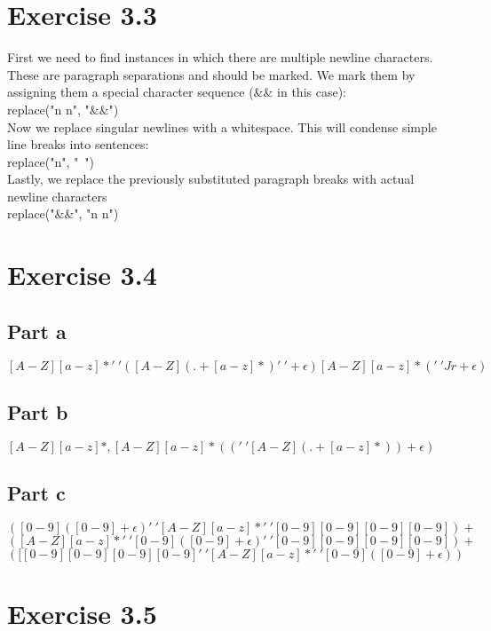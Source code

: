 \documentclass{article}%
\begin{document}
\section{Exercise 3.3}
First we need to find instances in which there are multiple newline characters. These are paragraph separations and should be
marked. We mark them by assigning them a special character sequence (\&\& in this case): \\

replace("\setminus n \setminus n", "\&\&") \\

\noindent Now we replace singular newlines with a whitespace. This will condense simple line breaks into sentences: \\

replace("\setminus n", "{\ }") \\

\noindent Lastly, we replace the previously substituted paragraph breaks with actual newline characters \\

replace("\&\&", "\setminus n \setminus n") \\

\section{Exercise 3.4}

\subsection{Part a}
$[A-Z][a-z]*'{\ }'([A-Z](. + [a-z]*)'{\ }' + \epsilon)[A-Z][a-z]*('{\ }'Jr + \epsilon)$

\subsection{Part b}
$[A-Z][a-z]*,[A-Z][a-z]*(('{\ }'[A-Z](. + [a-z]*)) + \epsilon)$

\subsection{Part c}
$([0-9]([0-9] + \epsilon)'{\ }'[A-Z][a-z]*'{\ }'[0-9][0-9][0-9][0-9]) +$ \\
$([A-Z][a-z]*'{\ }'[0-9]([0-9] + \epsilon)'{\ }'[0-9][0-9][0-9][0-9]) +$ \\
$([[0-9][0-9][0-9][0-9]'{\ }'[A-Z][a-z]*'{\ }'[0-9]([0-9] + \epsilon))$


\section{Exercise 3.5}
\end{document}
